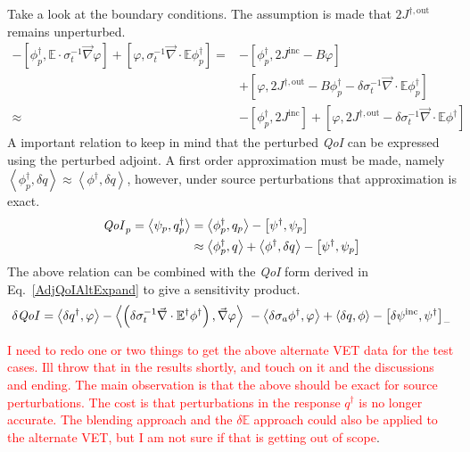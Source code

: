\documentclass[12pt]{report}
\newcommand{\bra}{\left\langle}
\newcommand{\ket}{\right\rangle}
\newcommand{\sbra}{\left[}
\newcommand{\sket}{\right]}
\renewcommand{\div}{\vec{\nabla} \cdot}
\newcommand{\grad}{\vec{\nabla}}
\newcommand{\Edd}{\mathbb{E}}
\newcommand{\siga}{\sigma_a}
\newcommand{\isigt}{\sigma_t^{-1}}
\newcommand{\angSource}{q}
\newcommand{\qoi}{{\it QoI}\xspace}
\newcommand{\comment}[2]{\marginpar{\textcolor{#2}{$\star$}}\textcolor{#2}{#1}\newline}
\newcommand{\iwh}[1]{\comment{#1}{red}}
\newcommand{\iwh}[1]{\phantom{a}}
\begin{document}
Take a look at the boundary conditions. The assumption is made that $2 J^{\dag,\text{out}}$ remains unperturbed.
\begin{equation}
\begin{split}
 - \sbra \phi^\dag_p, \Edd \cdot \isigt \grad \varphi \sket  + \sbra \varphi, \isigt \div \Edd \phi_p^\dag \sket 
=&- \sbra \phi_p^\dag, 2J^{\text{inc}} - B \varphi \sket \\ 
&+ \sbra \varphi, 2 J^{\dag,\text{out}} - B \phi_p^\dag - \delta \isigt \div \Edd \phi_p^\dag \sket \\
\approx&- \sbra \phi_p^\dag, 2J^{\text{inc}} \sket + \sbra \varphi , 2 J^{\dag,\text{out}} - \delta \isigt \div \Edd \phi^\dag \sket 
\end{split}
\end{equation}
A important relation to keep in mind that the perturbed \qoi can be expressed using the perturbed adjoint. A first order approximation must be made, namely $\bra \phi^\dag_p , \delta \angSource \ket \approx \bra \phi^\dag , \delta \angSource \ket$, however, under source perturbations that approximation is exact.
\begin{equation}
\begin{split}
\qoi_p  = \bra \psi_p , \angSource_p^\dag \ket &= \bra \phi^\dag_p , \angSource_p \ket - \sbra \psi^\dag,  \psi_p \sket \\
&\approx \bra \phi^\dag_p , \angSource \ket + \bra \phi^\dag , \delta \angSource \ket - \sbra \psi^\dag,  \psi_p \sket \\
\end{split} 
\end{equation}
The above relation can be combined with the \qoi form derived in Eq.~\eqref{AdjQoIAltExpand} to give a sensitivity product. 
\begin{equation}
\delta \qoi = \bra \delta q^\dag, \varphi \ket - \bra\left( \delta \isigt \div \Edd^\dag \phi^\dag  \right), \grad \varphi \ket \
- \bra \delta \siga \phi^\dag , \varphi \ket + \bra \delta q , \phi \ket - \sbra \delta \psi^{\text{inc}}, \psi^\dag \sket_-
\end{equation}

\iwh{I need to redo one or two things to get the above alternate VET data for the test cases. Ill throw that in the results shortly, and touch on it and the discussions and ending. The main observation is that the above should be exact for source perturbations. The cost is that perturbations in the response $q^\dag$ is no longer accurate. The blending approach and the $\delta \Edd$ approach could also be applied to the alternate VET, but I am not sure if that is getting out of scope}.
\end{document}
